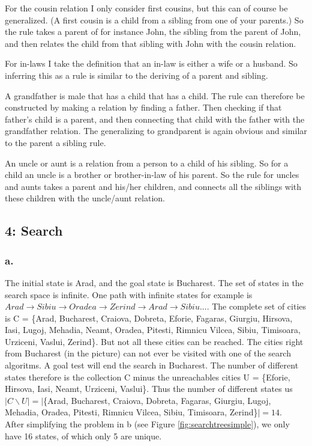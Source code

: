 \documentclass[a4paper]{article}
\begin{document}
For the cousin relation I only consider first cousins, but this can of course be generalized. (A first cousin is a child from a sibling from one of your parents.) So the rule takes a parent of for instance John, the sibling from the parent of John, and then relates the child from that sibling with John with the cousin relation. 

For in-laws I take the definition that an in-law is either a wife or a husband. So inferring this as a rule is similar to the deriving of a parent and sibling.

A grandfather is male that has a child that has a child. The rule can therefore be constructed by making a relation by finding a father. Then checking if that father's child is a parent, and then connecting that child with the father with the grandfather relation. The generalizing to grandparent is again obvious and similar to the parent a sibling rule. 

An uncle or aunt is a relation from a person to a child of his sibling. So for a child an uncle is a brother or brother-in-law of his parent. So the rule for uncles and aunts takes a parent and his/her children, and connects all the siblings with these children with the uncle/aunt relation.


\subsection*{4: Search}
\subsubsection*{a.}
The initial state is Arad, and the goal state is Bucharest. The set of states in the search space is infinite. One path with infinite states for example is $Arad \rightarrow Sibiu \rightarrow Oradea \rightarrow Zerind \rightarrow Arad \rightarrow Sibiu...$. 
The complete set of cities is C = \{Arad, Bucharest, Craiova, Dobreta, Eforie, Fagaras, Giurgiu, Hirsova, Iasi, Lugoj, Mehadia, Neamt, Oradea, Pitesti, Rimnicu Vilcea, Sibiu, Timisoara, Urziceni, Vaslui, Zerind\}. But not all these cities can be reached. The cities right from Bucharest (in the picture) can not ever be visited with one of the search algoritms. A goal test will end the search in Bucharest. The number of different states therefore is the collection C minus the unreachables cities U = \{Eforie, Hirsova, Iasi, Neamt, Urziceni, Vaslui\}. Thus the number of different states us $|C \backslash U| = |$\{Arad, Bucharest, Craiova, Dobreta, Fagaras, Giurgiu, Lugoj, Mehadia, Oradea, Pitesti, Rimnicu Vilcea, Sibiu, Timisoara, Zerind\}$| = 14$. \\
After simplifying the problem in b (see Figure \ref{fig:searchtreesimple}), we only have 16 states, of which only 5 are unique.
\end{document}

